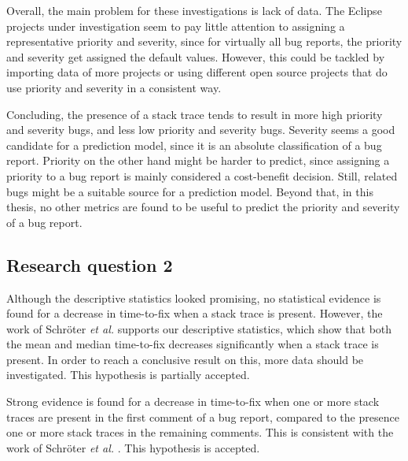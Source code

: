 Overall, the main problem for these investigations is lack of data. The Eclipse projects under investigation seem to pay little attention to assigning a representative priority and severity, since for virtually all bug reports, the priority and severity get assigned the default values. However, this could be tackled by importing data of more projects or using different open source projects that do use priority and severity in a consistent way.

Concluding, the presence of a stack trace tends to result in more high priority and severity bugs, and less low priority and severity bugs. Severity seems a good candidate for a prediction model, since it is an absolute classification of a bug report. Priority on the other hand might be harder to predict, since assigning a priority to a bug report is mainly considered a cost-benefit decision. Still, related bugs might be a suitable source for a prediction model. Beyond that, in this thesis, no other metrics are found to be useful to predict the priority and severity of a bug report.

\subsection{Research question 2} %

\questionb{}

\vspace{\baselineskip}
\hypba{}
\vspace{\baselineskip}

\noindent
Although the descriptive statistics looked promising, no statistical evidence is found for a decrease in time-to-fix when a stack trace is present. However, the work of Schr\"{o}ter \emph{et al.} \cite{Schroter2010} supports our descriptive statistics, which show that both the mean and median time-to-fix decreases significantly when a stack trace is present. In order to reach a conclusive result on this, more data should be investigated. This hypothesis is partially accepted.

\vspace{\baselineskip}
\hypbb{}
\vspace{\baselineskip}

\noindent
Strong evidence is found for a decrease in time-to-fix when one or more stack traces are present in the first comment of a bug report, compared to the presence one or more stack traces in the remaining comments. This is consistent with the work of Schr\"{o}ter \emph{et al.} \cite{Schroter2010}. This hypothesis is accepted.


